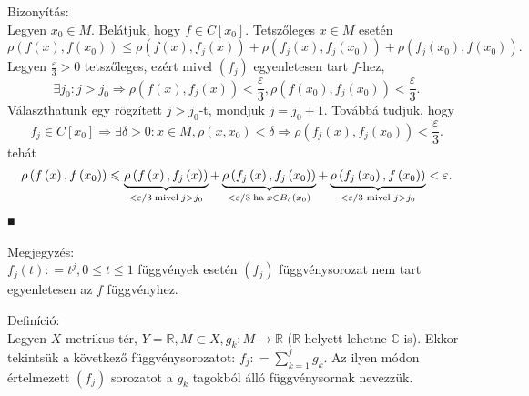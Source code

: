 \documentclass[12pt,a4paper]{scrartcl}
\newenvironment{definicio}{}{}
\newenvironment{bizonyitas}{}{}
\newenvironment{megjegyzes}{}{}
\begin{document}
\begin{bizonyitas}

Bizonyítás:\\
Legyen \(x_{0} \in M\). Belátjuk, hogy
\(f \in C\left\lbrack x_{0} \right\rbrack\). Tetszőleges \(x \in M\)
esetén
\[{\rho\left( {f\left( x \right),f\left( x_{0} \right)} \right) \leq \rho\left( {f\left( x \right),f_{j}\left( x \right)} \right) + \rho\left( {f_{j}\left( x \right),f_{j}\left( x_{0} \right)} \right) + \rho\left( {f_{j}\left( x_{0} \right),f\left( x_{0} \right)} \right)}.\]
Legyen \(\frac{\varepsilon}{3} > 0\) tetszőleges, ezért mivel
\(\left( f_{j} \right)\) egyenletesen tart \(f\)-hez,
\[\left. \exists j_{0}:j > j_{0}\Rightarrow\rho\left( {f\left( x \right),f_{j}\left( x \right)} \right) < \frac{\varepsilon}{3},\rho\left( {f\left( x_{0} \right),f_{j}\left( x_{0} \right)} \right) < \frac{\varepsilon}{3}. \right.\]
Választhatunk egy rögzített \(j > j_{0}\)-t, mondjuk \(j = j_{0} + 1\).
Továbbá tudjuk, hogy
\[\left. f_{j} \in C\left\lbrack x_{0} \right\rbrack\Rightarrow\exists\delta > 0:x \in M,\rho\left( {x,x_{0}} \right) < \delta\Rightarrow\rho\left( {f_{j}\left( x \right),f_{j}\left( x_{0} \right)} \right) < \frac{\varepsilon}{3}. \right.\]
tehát
\[\rho \left( {f\left( x \right),f\left( {{x_0}} \right)} \right) \leqslant \underbrace {\rho \left( {f\left( x \right),{f_j}\left( x \right)} \right)}_{ < \varepsilon /3{\text{\;mivel\;}}j > {j_0}} + \underbrace {\rho \left( {{f_j}\left( x \right),{f_j}\left( {{x_0}} \right)} \right)}_{ < \varepsilon /3{\text{\;ha\;}}x \in {B_\delta }\left( {{x_0}} \right)} + \underbrace {\rho \left( {{f_j}\left( {{x_0}} \right),f\left( {{x_0}} \right)} \right)}_{ < \varepsilon /3{\text{ mivel }}j > {j_0}} < \varepsilon .\]
■

\end{bizonyitas}

\begin{megjegyzes}

Megjegyzés:\\
\(f_{j}\left( t \right): = t^{j},0 \leq t \leq 1\) függvények esetén
\(\left( f_{j} \right)\) függvénysorozat nem tart egyenletesen az \(f\)
függvényhez.

\end{megjegyzes}

\begin{definicio}

Definíció:\\
Legyen \(X\) metrikus tér,
\(\left. Y = {\mathbb{R}},M \subset X,g_{k}:M\rightarrow{\mathbb{R}} \right.\)
(\(\mathbb{R}\) helyett lehetne \(\mathbb{C}\) is). Ekkor tekintsük a
következő függvénysorozatot:
\(f_{j}: = {\sum\limits_{k = 1}^{j}g_{k}}\). Az ilyen módon értelmezett
\(\left( f_{j} \right)\) sorozatot a \(g_{k}\) tagokból álló
függvénysornak nevezzük.

\end{definicio}
\end{document}
